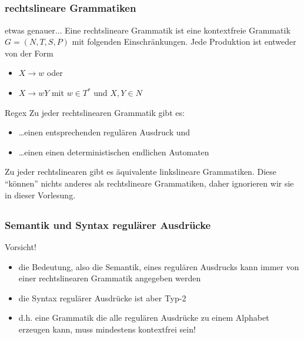 \subsection*{}
\begin{frame}
	\frametitle{rechtslineare Grammatiken}
	\begin{block}{etwas genauer...}
  		Eine rechtslineare Grammatik ist eine kontextfreie Grammatik $G=(N,T,S,P)$ mit folgenden Einschränkungen. Jede Produktion ist entweder von der Form
  		\begin{itemize}
			\item $X \rightarrow w$ oder
			\item $X \rightarrow wY$ mit $w \in T^*$ und $X,Y \in N$
  		\end{itemize}
	\end{block} \pause

	\begin{block}{Regex}
    Zu jeder rechtslinearen Grammatik gibt es:
		\begin{itemize}
			\item \ldots einen entsprechenden regulären Ausdruck und \pause
			\item \ldots einen einen deterministischen endlichen Automaten
        \end{itemize}
    Zu jeder rechtslinearen gibt es äquivalente linkslineare Grammatiken. Diese
    "`können"' nichts anderes als rechtslineare Grammatiken, daher ignorieren
    wir sie in dieser Vorlesung.
	\end{block}
\end{frame}

\subsection*{}
\begin{frame}
	\frametitle{Semantik und Syntax regulärer Ausdrücke}
	\begin{block}{Vorsicht!}
		\begin{itemize}
			\item die Bedeutung, also die Semantik,  eines regulären Ausdrucks kann
			immer von einer rechtslinearen Grammatik angegeben werden \pause
			\item die Syntax regulärer Ausdrücke ist aber Typ-2 \pause
			\item d.h. eine Grammatik die alle regulären Ausdrücke zu einem Alphabet
			erzeugen kann, muss mindestens kontextfrei sein!
        \end{itemize}
  	\end{block}
\end{frame}

